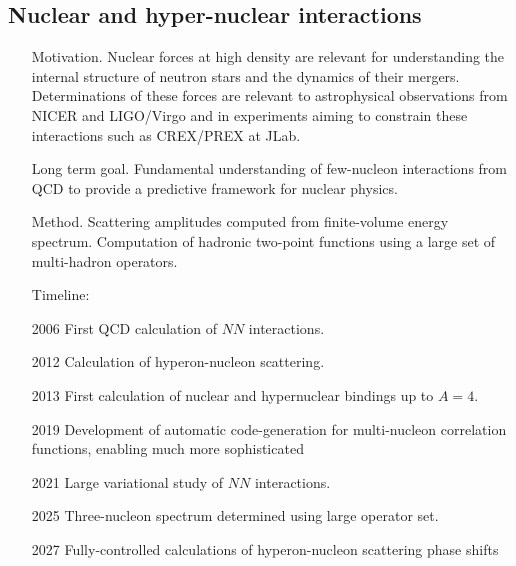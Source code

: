 \documentclass{article}
\begin{document}
\subsection{Nuclear and hyper-nuclear interactions}

\begin{itemize}
    \item[Motivation.] Nuclear forces at high density are relevant for understanding  the internal structure  of neutron stars and the dynamics of their mergers. Determinations of these forces are relevant to astrophysical observations from NICER and LIGO/Virgo and in experiments aiming to constrain  these interactions such as CREX/PREX at JLab.
    
    \item[Long term goal.] Fundamental understanding of few-nucleon interactions from QCD to provide a predictive framework for nuclear physics. 
    
    \item[Method.] Scattering
      amplitudes computed from finite-volume energy spectrum. Computation of hadronic two-point functions
      using a large set of multi-hadron operators.
      
\item[Timeline:]
    \item[2006] First QCD calculation of $NN$ interactions.
    \item[2012] Calculation of hyperon-nucleon scattering.
    \item[2013] First calculation of nuclear and hypernuclear bindings up to $A=4$.
    \item[2019] Development of automatic code-generation for multi-nucleon correlation functions, enabling much more sophisticated 
    \item[2021] Large variational study of $NN$ interactions.
    \item[2025] Three-nucleon spectrum determined using large operator set.
    \item[2027] Fully-controlled calculations of hyperon-nucleon scattering phase shifts
    
\end{itemize}


\end{document}

